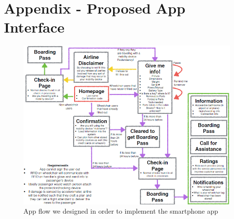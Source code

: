 \chapter{Appendix - Proposed App Interface}

\begin{figure}[h]
  \centering
     \includegraphics[scale=0.75]{images/App_flow.png}
  \caption{App flow we designed in order to implement the smartphone app}
  \label{fig:App_flow}
\end{figure}

